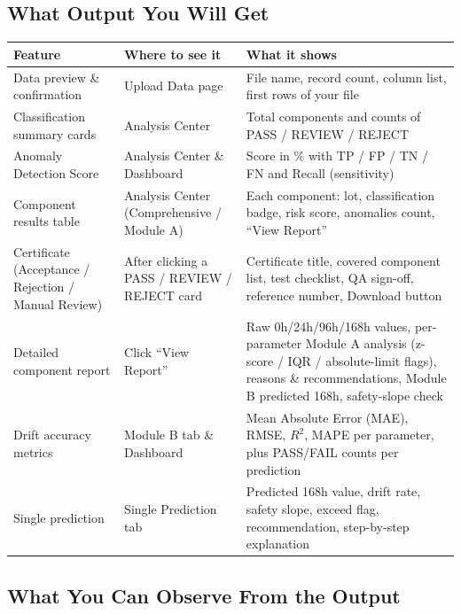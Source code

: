 \documentclass[11pt,a4paper]{article}
\begin{document}
\subsection{What Output You Will Get}
\begin{center}
\small
\begin{tabularx}{\textwidth}{@{}lXX@{}}
\toprule
\textbf{Feature} & \textbf{Where to see it} & \textbf{What it shows}\\
\midrule
Data preview \& confirmation & Upload Data page & File name, record count, column list, first rows of your file\\[2pt]
Classification summary cards & Analysis Center & Total components and counts of PASS / REVIEW / REJECT\\[2pt]
Anomaly Detection Score & Analysis Center \& Dashboard & Score in \% with TP / FP / TN / FN and Recall (sensitivity)\\[2pt]
Component results table & Analysis Center (Comprehensive / Module A) & Each component: lot, classification badge, risk score, anomalies count, ``View Report''\\[2pt]
Certificate (Acceptance / Rejection / Manual Review) & After clicking a PASS / REVIEW / REJECT card & Certificate title, covered component list, test checklist, QA sign-off, reference number, Download button\\[2pt]
Detailed component report & Click ``View Report'' & Raw 0h/24h/96h/168h values, per-parameter Module A analysis (z-score / IQR / absolute-limit flags), reasons \& recommendations, Module B predicted 168h, safety-slope check\\[2pt]
Drift accuracy metrics & Module B tab \& Dashboard & Mean Absolute Error (MAE), RMSE, $R^2$, MAPE per parameter, plus PASS/FAIL counts per prediction\\[2pt]
Single prediction & Single Prediction tab & Predicted 168h value, drift rate, safety slope, exceed flag, recommendation, step-by-step explanation\\
\bottomrule
\end{tabularx}
\end{center}

\subsection{What You Can Observe From the Output}
\end{document}
